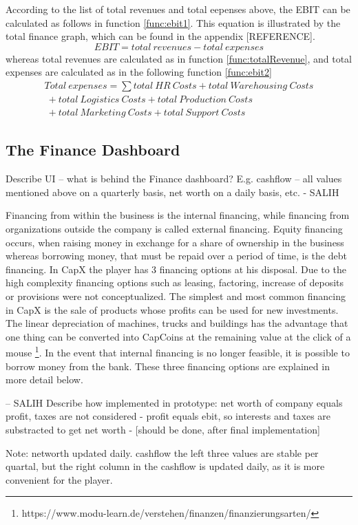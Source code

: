According to the list of total revenues and total eepenses above, the EBIT can be calculated as follows in function \ref{func:ebit1}. This equation is illustrated by the total finance graph, which can be found in the appendix [REFERENCE]. 
\begin{equation}
\label{func:ebit1}
    EBIT = total~revenues - total~expenses
\end{equation}
whereas total revenues are calculated as in function \ref{func:totalRevenue}, and total expenses are calculated as in the following function \ref{func:ebit2}
\begin{equation}
    \label{func:ebit2}
    \begin{split}
       Total \ expenses = \sum total \ HR \ Costs + total \ Warehousing \ Costs \\\ +  total \ Logistics \ Costs + total \ Production \ Costs \\\ + total \ Marketing \ Costs + total \ Support \ Costs 
    \end{split}
\end{equation}


\subsection{The Finance Dashboard}
Describe UI – what is behind the Finance dashboard? E.g. cashflow – all values mentioned above on a quarterly basis, net worth on a daily basis, etc. - SALIH

Financing from within the business is the internal financing, while financing from organizations outside the company is called external financing. Equity financing occurs, when raising money in exchange for a share of ownership in the business whereas borrowing money, that must be repaid over a period of time, is the debt financing. 
In CapX the player has 3 financing options at his disposal. Due to the high complexity financing options such as leasing, factoring, increase of deposits or provisions were not conceptualized. 
The simplest and most common financing in CapX is the sale of products whose profits can be used for new investments. The linear depreciation of machines, trucks and buildings has the advantage that one thing can be converted into CapCoins at the remaining value at the click of a mouse \footnote{https://www.modu-learn.de/verstehen/finanzen/finanzierungsarten/}.
In the event that internal financing is no longer feasible, it is possible to borrow money from the bank. These three financing options are explained in more detail below.

– SALIH
Describe how implemented in prototype: net worth of company equals profit, taxes are not considered - profit equals ebit, so interests and taxes are substracted to get net worth - [should be done, after final implementation]

Note: networth updated daily. cashflow the left three values are stable per quartal, but the right column in the cashflow is updated daily, as it is more convenient for the player.